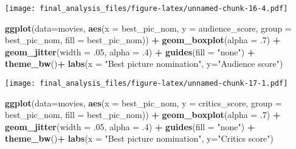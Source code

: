 \documentclass[]{article}
\newenvironment{Shaded}{\begin{snugshade}}{\end{snugshade}}
\newcommand{\KeywordTok}[1]{\textcolor[rgb]{0.13,0.29,0.53}{\textbf{#1}}}
\newcommand{\DataTypeTok}[1]{\textcolor[rgb]{0.13,0.29,0.53}{#1}}
\newcommand{\DecValTok}[1]{\textcolor[rgb]{0.00,0.00,0.81}{#1}}
\newcommand{\StringTok}[1]{\textcolor[rgb]{0.31,0.60,0.02}{#1}}
\newcommand{\OperatorTok}[1]{\textcolor[rgb]{0.81,0.36,0.00}{\textbf{#1}}}
\newcommand{\NormalTok}[1]{#1}
\begin{document}
\texttt{[image: final\_analysis\_files/figure-latex/unnamed-chunk-16-4.pdf]}

\begin{Shaded}
\begin{Highlighting}[]
\KeywordTok{ggplot}\NormalTok{(}\DataTypeTok{data=}\NormalTok{movies, }\KeywordTok{aes}\NormalTok{(}\DataTypeTok{x =}\NormalTok{ best_pic_nom, }\DataTypeTok{y =}\NormalTok{ audience_score, }\DataTypeTok{group =}\NormalTok{ best_pic_nom, }\DataTypeTok{fill =}\NormalTok{ best_pic_nom)) }\OperatorTok{+}
\StringTok{  }\KeywordTok{geom_boxplot}\NormalTok{(}\DataTypeTok{alpha =}\NormalTok{ .}\DecValTok{7}\NormalTok{) }\OperatorTok{+}
\StringTok{  }\KeywordTok{geom_jitter}\NormalTok{(}\DataTypeTok{width =}\NormalTok{ .}\DecValTok{05}\NormalTok{, }\DataTypeTok{alpha =}\NormalTok{ .}\DecValTok{4}\NormalTok{) }\OperatorTok{+}
\StringTok{  }\KeywordTok{guides}\NormalTok{(}\DataTypeTok{fill =} \StringTok{"none"}\NormalTok{) }\OperatorTok{+}
\StringTok{  }\KeywordTok{theme_bw}\NormalTok{()}\OperatorTok{+}
\StringTok{  }\KeywordTok{labs}\NormalTok{(}\DataTypeTok{x =} \StringTok{"Best picture nomination"}\NormalTok{, }\DataTypeTok{y=}\StringTok{"Audience score"}\NormalTok{)}
\end{Highlighting}
\end{Shaded}

\texttt{[image: final\_analysis\_files/figure-latex/unnamed-chunk-17-1.pdf]}

\begin{Shaded}
\begin{Highlighting}[]
\KeywordTok{ggplot}\NormalTok{(}\DataTypeTok{data=}\NormalTok{movies, }\KeywordTok{aes}\NormalTok{(}\DataTypeTok{x =}\NormalTok{ best_pic_nom, }\DataTypeTok{y =}\NormalTok{ critics_score, }\DataTypeTok{group =}\NormalTok{ best_pic_nom, }\DataTypeTok{fill =}\NormalTok{ best_pic_nom)) }\OperatorTok{+}
\StringTok{  }\KeywordTok{geom_boxplot}\NormalTok{(}\DataTypeTok{alpha =}\NormalTok{ .}\DecValTok{7}\NormalTok{) }\OperatorTok{+}
\StringTok{  }\KeywordTok{geom_jitter}\NormalTok{(}\DataTypeTok{width =}\NormalTok{ .}\DecValTok{05}\NormalTok{, }\DataTypeTok{alpha =}\NormalTok{ .}\DecValTok{4}\NormalTok{) }\OperatorTok{+}
\StringTok{  }\KeywordTok{guides}\NormalTok{(}\DataTypeTok{fill =} \StringTok{"none"}\NormalTok{) }\OperatorTok{+}\StringTok{ }
\StringTok{  }\KeywordTok{theme_bw}\NormalTok{()}\OperatorTok{+}
\StringTok{  }\KeywordTok{labs}\NormalTok{(}\DataTypeTok{x =} \StringTok{"Best picture nomination"}\NormalTok{, }\DataTypeTok{y=}\StringTok{"Critics score"}\NormalTok{)}
\end{Highlighting}
\end{Shaded}
\end{document}

